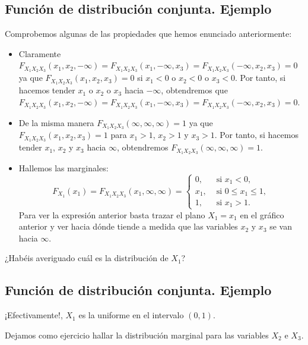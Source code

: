 \documentclass[]{book}
\begin{document}
\hypertarget{funciuxf3n-de-distribuciuxf3n-conjunta.-ejemplo-10}{%
\subsection{Función de distribución conjunta. Ejemplo}\label{funciuxf3n-de-distribuciuxf3n-conjunta.-ejemplo-10}}

Comprobemos algunas de las propiedades que hemos enunciado anteriormente:

\begin{itemize}
\item
  Claramente \(F_{X_1X_2X_3}(x_1,x_2,-\infty)=F_{X_1X_2X_3}(x_1,-\infty,x_3)=F_{X_1X_2X_3}(-\infty,x_2,x_3)=0\) ya que \(F_{X_1X_2X_3}(x_1,x_2,x_3)=0\) si \(x_1<0\) o \(x_2<0\) o \(x_3<0\). Por tanto, si hacemos tender \(x_1\) o \(x_2\) o \(x_3\) hacia \(-\infty\), obtendremos que \(F_{X_1X_2X_3}(x_1,x_2,-\infty)=F_{X_1X_2X_3}(x_1,-\infty,x_3)=F_{X_1X_2X_3}(-\infty,x_2,x_3)=0\).
\item
  De la misma manera \(F_{X_1X_2X_3}(\infty,\infty,\infty)=1\) ya que \(F_{X_1X_2X_3}(x_1,x_2,x_3)=1\) para \(x_1>1\), \(x_2>1\) y \(x_3>1\). Por tanto, si hacemos tender \(x_1\), \(x_2\) y \(x_3\) hacia \(\infty\), obtendremos \(F_{X_1X_2X_3}(\infty,\infty,\infty)=1\).
\item
  Hallemos las marginales:
  \[
  F_{X_1}(x_1)=F_{X_1X_2X_3}(x_1,\infty,\infty)=\begin{cases}
  0, & \mbox{ si }x_1 < 0,\\
  x_1, & \mbox{ si } 0\leq x_1\leq 1,\\
  1, & \mbox{ si } x_1>1.
  \end{cases}
  \]
  Para ver la expresión anterior basta trazar el plano \(X_1=x_1\) en el gráfico anterior y ver hacia dónde tiende a medida que las variables \(x_2\) y \(x_3\) se van hacia \(\infty\).
\end{itemize}

¿Habéis averiguado cuál es la distribución de \(X_1\)?

\hypertarget{funciuxf3n-de-distribuciuxf3n-conjunta.-ejemplo-11}{%
\subsection{Función de distribución conjunta. Ejemplo}\label{funciuxf3n-de-distribuciuxf3n-conjunta.-ejemplo-11}}

¡Efectivamente!, \(X_1\) es la uniforme en el intervalo \((0,1)\).

Dejamos como ejercicio hallar la distribución marginal para las variables \(X_2\) e \(X_3\).
\end{document}
